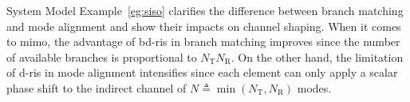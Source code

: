 \documentclass[journal]{IEEEtran}
\begin{document}
\begin{section}{System Model}
		Example~\ref{eg:siso} clarifies the difference between branch matching and mode alignment and show their impacts on channel shaping.
		When it comes to \gls{mimo}, the advantage of \gls{bd}-\gls{ris} in branch matching improves since the number of available branches is proportional to $N_\mathrm{T} N_\mathrm{R}$. On the other hand, the limitation of \gls{d}-\gls{ris} in mode alignment intensifies since each element can only apply a scalar phase shift to the indirect channel of $N \triangleq \min(N_\mathrm{T}, N_\mathrm{R})$ modes.

\end{section}
\end{document}
